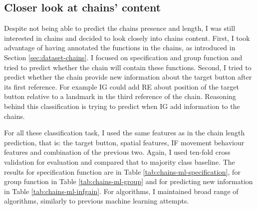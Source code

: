 \subsection{Closer look at chains' content}
Despite not being able to predict the chains presence and length, I was still interested in chains and decided to look closely into chains content. First, I took advantage of having annotated the functions in the chains, as introduced in Section \ref{sec:dataset-chains}. I focused on specification and group function and tried to predict whether the chain will contain these functions. Second, I tried to predict whether the chain provide new information about the target button after its first reference. For example IG could add RE about position of the target button relative to a landmark in the third reference of the chain. Reasoning behind this classification is trying to predict when IG add information to the chains.

For all these classification task, I used the same features as in the chain length prediction, that is: the target button, spatial features, IF movement behaviour features and combination of the previous two. Again, I used ten-fold cross validation for evaluation and compared that to majority class baseline. The results for specification function are in Table \ref{tab:chains-ml-specification}, for group function in Table \ref{tab:chains-ml-group} and for predicting new information in Table \ref{tab:chains-ml-infgain}. For algorithms, I maintained broad range of algorithms, similarly to previous machine learning attempts.


